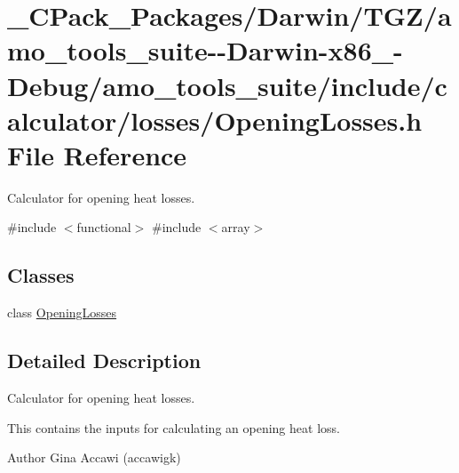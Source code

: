 \hypertarget{___c_pack___packages_2_darwin_2_t_g_z_2amo__tools__suite--_darwin-x86__64-_debug_2amo__tools__suee79e9c37a9bbbd79929c0174c4a9eb8}{}\section{\+\_\+\+C\+Pack\+\_\+\+Packages/\+Darwin/\+T\+G\+Z/amo\+\_\+tools\+\_\+suite-\/-\/\+Darwin-\/x86\+\_-\/\+Debug/amo\+\_\+tools\+\_\+suite/include/calculator/losses/\+Opening\+Losses.h File Reference}
\label{___c_pack___packages_2_darwin_2_t_g_z_2amo__tools__suite--_darwin-x86__64-_debug_2amo__tools__suee79e9c37a9bbbd79929c0174c4a9eb8}


Calculator for opening heat losses.  


{\ttfamily \#include $<$functional$>$}\newline
{\ttfamily \#include $<$array$>$}\newline
\subsection*{Classes}
\begin{DoxyCompactItemize}
\item 
class \hyperlink{class_opening_losses}{Opening\+Losses}
\end{DoxyCompactItemize}


\subsection{Detailed Description}
Calculator for opening heat losses. 

This contains the inputs for calculating an opening heat loss.

\begin{DoxyAuthor}{Author}
Gina Accawi (accawigk) 
\end{DoxyAuthor}
